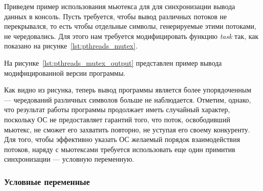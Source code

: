 Приведем пример использования мьютекса для для синхронизации вывода данных в консоль.
Пусть требуется, чтобы вывод различных потоков не перекрывался,
то есть чтобы отдельные символы, генерируемые этими потоками, не чередовались.
Для этого нам требуется модифицировать функцию \textit{task} так, как показано на
рисунке~\ref{lst:pthreads_mutex}.



На рисунке~\ref{lst:pthreads_mutex_output} представлен пример вывода
модифицированной версии программы.



Как видно из рисунка, теперь вывод программы является более упорядоченным ---
чередований различных символов больше не наблюдается.
Отметим, однако, что результат работы программы продолжает иметь случайный характер,
поскольку ОС не предоставляет гарантий того, что поток, освободивший мьютекс,
не сможет его захватить повторно, не уступая его своему конкуренту.
Для того, чтобы эффективно указать ОС желаемый порядок взаимодействия потоков,
наряду с мьютексами требуется использовать еще один примитив синхронизации ---
условную переменную.

\subsubsection{Условные переменные}

